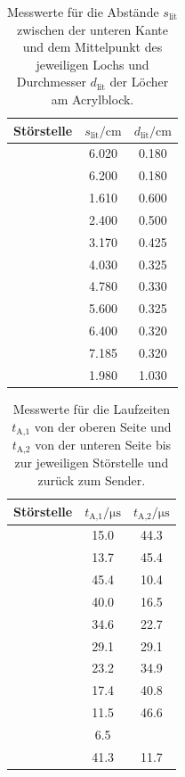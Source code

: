 \begin{table}[h]
  \centering
  \begin{tabular}{S S S}
    \toprule
    {Störstelle} & {$s_\text{lit}/\si{\centi\meter}$} & {$d_\text{lit}
    /\si{\centi\meter}$}\\
    \midrule
     & 6.020 & 0.180 \\
     & 6.200 & 0.180 \\
     & 1.610 & 0.600 \\
     & 2.400 & 0.500 \\
     & 3.170 & 0.425 \\
     & 4.030 & 0.325 \\
     & 4.780 & 0.330 \\
     & 5.600 & 0.325 \\
     & 6.400 & 0.320 \\
     & 7.185 & 0.320 \\
     & 1.980 & 1.030 \\
    \bottomrule
  \end{tabular}
  \caption{Messwerte für die Abstände $s_\text{lit}$ zwischen der unteren
  Kante und dem Mittelpunkt des jeweiligen Lochs und Durchmesser $d_\text{lit}$
  der Löcher am Acrylblock.}
  \label{tab:AbmessungenAcryl}
\end{table}

\begin{table}[h]
  \centering
  \begin{tabular}{S S S}
    \toprule
    {Störstelle} & {$t_\text{A,1}/\si{\micro\second}$} & {$t_\text{A,2}
    /\si{\micro\second}$}\\
    \midrule
     & 15.0 & 44.3 \\
     & 13.7 & 45.4 \\
     & 45.4 & 10.4 \\
     & 40.0 & 16.5 \\
     & 34.6 & 22.7 \\
     & 29.1 & 29.1 \\
     & 23.2 & 34.9 \\
     & 17.4 & 40.8 \\
     & 11.5 & 46.6 \\
     & 6.5 & \text{ } \\
     & 41.3 & 11.7 \\
    \bottomrule
  \end{tabular}
  \caption{Messwerte für die Laufzeiten $t_\text{A,1}$ von der oberen Seite und
  $t_\text{A,2}$ von der unteren Seite bis zur jeweiligen Störstelle und zurück
  zum Sender.}
  \label{tab:AScanZeiten}
\end{table}


